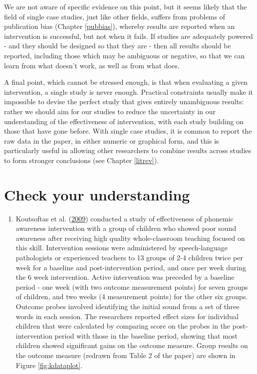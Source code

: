 \documentclass{krantz}
\providecommand{\tightlist}{%
\setlength{\itemsep}{0pt}\setlength{\parskip}{0pt}}
\begin{document}
We are not aware of specific evidence on this point, but it seems likely that the field of single case studies, just like other fields, suffers from problems of publication bias (Chapter \ref{pubbias}), whereby results are reported when an intervention is successful, but not when it fails. If studies are adequately powered - and they should be designed so that they are - then all results should be reported, including those which may be ambiguous or negative, so that we can learn from what doesn't work, as well as from what does.

A final point, which cannot be stressed enough, is that when evaluating a given intervention, a single study is never enough. Practical constraints usually make it impossible to devise the perfect study that gives entirely unambiguous results: rather we should aim for our studies to reduce the uncertainty in our understanding of the effectiveness of intervention, with each study building on those that have gone before. With single case studies, it is common to report the raw data in the paper, in either numeric or graphical form, and this is particularly useful in allowing other researchers to combine results across studies to form stronger conclusions (see Chapter \ref{litrev}).

\hypertarget{check-your-understanding-19}{%
\section{Check your understanding}\label{check-your-understanding-19}}

\begin{enumerate}
\def\labelenumi{\arabic{enumi}.}
\tightlist
\item
  Koutsoftas et al. (\protect\hyperlink{ref-koutsoftas2009}{2009}) conducted a study of effectiveness of phonemic awareness intervention with a group of children who showed poor sound awareness after receiving high quality whole-classroom teaching focused on this skill. Intervention sessions were administered by speech-language pathologists or experienced teachers to 13 groups of 2-4 children twice per week for a baseline and post-intervention period, and once per week during the 6 week intervention. Active intervention was preceded by a baseline period - one week (with two outcome measurement points) for seven groups of children, and two weeks (4 measurement points) for the other six groups. Outcome probes involved identifying the initial sound from a set of three words in each session. The researchers reported effect sizes for individual children that were calculated by comparing score on the probes in the post-intervention period with those in the baseline period, showing that most children showed significant gains on the outcome measure. Group results on the outcome measure (redrawn from Table 2 of the paper) are shown in Figure \ref{fig:kdataplot}.
\end{enumerate}
\end{document}

